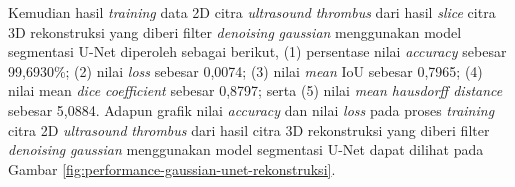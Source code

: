 \begin{enumerate}
	Kemudian hasil \textit{training} data 2D citra \textit{ultrasound} \textit{thrombus} dari hasil \textit{slice} citra 3D rekonstruksi yang diberi filter \textit{denoising} \textit{gaussian} menggunakan model segmentasi U-Net diperoleh sebagai berikut, (1) persentase nilai \textit{accuracy} sebesar 99,6930\%; (2) nilai \textit{loss} sebesar 0,0074; (3) nilai \textit{mean} IoU sebesar 0,7965; (4) nilai mean \textit{dice coefficient} sebesar 0,8797; serta (5) nilai \textit{mean hausdorff distance} sebesar 5,0884. Adapun grafik nilai \textit{accuracy} dan nilai \textit{loss} pada proses \textit{training} citra 2D \textit{ultrasound} \textit{thrombus} dari hasil citra 3D rekonstruksi yang diberi filter \textit{denoising} \textit{gaussian} menggunakan model segmentasi U-Net dapat dilihat pada Gambar \ref{fig:performance-gaussian-unet-rekonstruksi}.
	

\end{enumerate}
